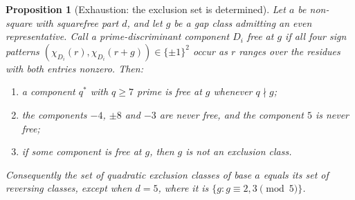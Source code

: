 \documentclass[11pt,reqno]{amsart}
\theoremstyle{plain}
\newtheorem{proposition}[theorem]{Proposition}
\theoremstyle{definition}
\begin{document}
\begin{proposition}[Exhaustion: the exclusion set is determined]
\label{prop:exhaustion}
Let $a$ be non-square with squarefree part $d$, and let $g$ be a gap class
admitting an even representative. Call a prime-discriminant component $D_i$
\emph{free at $g$} if all four sign patterns
$(\chi_{D_i}(r), \chi_{D_i}(r+g)) \in \{\pm 1\}^2$ occur as $r$ ranges over the
residues with both entries nonzero. Then:
\begin{enumerate}
\item a component $q^*$ with $q \ge 7$ prime is free at $g$ whenever
      $q \nmid g$;
\item the components $-4$, $\pm 8$ and $-3$ are never free, and the component
      $5$ is never free;
\item if some component is free at $g$, then $g$ is not an exclusion class.
\end{enumerate}
Consequently the set of quadratic exclusion classes of base $a$ equals its set
of reversing classes, except when $d = 5$, where it is
$\{g : g \equiv 2, 3 \pmod 5\}$.
\end{proposition}
\end{document}

